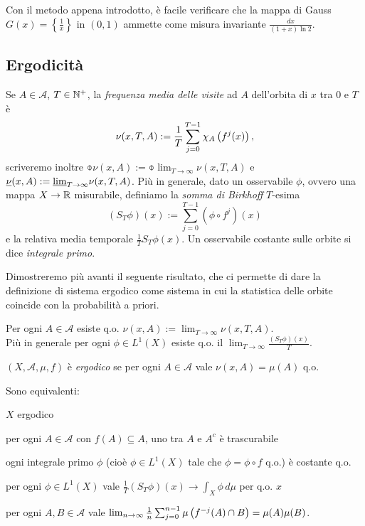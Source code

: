 \begin{esercizio} Con il metodo appena introdotto, è facile verificare che la mappa di Gauss $G(x)=\left\{\frac{1}{x}\right\}$ in $(0,1)$ ammette come misura invariante
 $\frac{dx}{(1+x)\ln 2}$.\end{esercizio}



\subsection{Ergodicità}

\begin{defi} Se $A\in\mathcal{A}$, $T\in\mathbb{N}^+$, la \emph{frequenza media delle visite} ad $A$ dell'orbita di $x$ tra $0$ e $T$ è
\[\nu(x,T,A):=\frac{1}{T}\sum_{j=0}^{T-1}\chi_A\left(f^j(x)\right),\]
scriveremo inoltre $\obar{\nu}(x,A):=\obar{\lim}_{T\to\infty}\nu(x,T,A)$ e $\underline{\nu}(x,A):=\underline{\lim}_{T\to\infty}\nu(x,T,A)$.
Più in generale, dato un osservabile $\phi$, ovvero una mappa $X\rightarrow \mathbb{R}$ misurabile, definiamo la \emph{somma di Birkhoff} $T$-esima
\[(S_T\phi)(x):=\sum_{j=0}^{T-1}(\phi\circ f^j)(x)\]
e la relativa media temporale $\frac{1}{T}S_T\phi(x)$. Un osservabile costante sulle orbite si dice \emph{integrale primo}.
\end{defi}

Dimostreremo più avanti il seguente risultato, 
che ci permette di dare la definizione di sistema ergodico come sistema in cui la statistica delle orbite coincide con la probabilità a priori.

\begin{teo}[Birkhoff]Per ogni $A\in\mathcal{A}$ esiste q.o. $\nu(x,A):=\lim_{T\to\infty}\nu(x,T,A)$. \\
Più in generale per ogni $\phi\in L^1(X)$ esiste q.o. il $\lim_{T\to\infty}\frac{(S_T\phi)(x)}{T}$.
\end{teo}

\begin{defi}$(X,\mathcal{A},\mu,f)$ è \emph{ergodico} se per ogni $A\in\mathcal{A}$ vale $\nu(x,A)=\mu(A)$ q.o.
\end{defi}

\begin{teo}Sono equivalenti:
\begin{lista}
	\item $X$ ergodico 
	\item per ogni $A\in\mathcal{A}$ con $f(A)\subseteq A$, uno tra $A$ e $A^c$ è trascurabile 
	\item ogni integrale primo $\phi$ (cioè $\phi\in L^1(X)$ tale che $\phi=\phi\circ f$ q.o.) è costante q.o. 
	\item per ogni $\phi\in L^1(X)$ vale $\frac{1}{T}(S_T\phi)(x)\to\int_X \phi\,d\mu$ per q.o. $x$ 
	\item per ogni $A,B\in\mathcal{A}$ vale $\lim_{n\to\infty}\frac{1}{n}\sum_{j=0}^{n-1}\mu\left(f^{-j}(A)\cap B\right)=\mu(A)\mu(B)$. 
\end{lista}
\end{teo}

